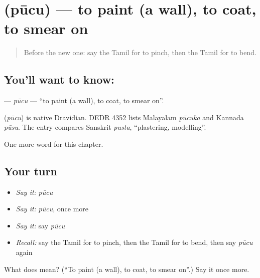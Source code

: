 \section[\texorpdfstring{\ta{பூசு} (pūcu)}{பூசு (pūcu)}]{ (pūcu) — to paint (a wall), to coat, to smear on}

\label{lesson:TA-C200-pucu}



\begin{quote}
Before the new one: say the Tamil for to pinch, then the Tamil for to bend.
\end{quote}

\subsection*{You'll want to know: }
\textbf{} — \emph{pūcu} — \textquotedblleft{}to paint (a wall), to coat, to smear on\textquotedblright{}.

\begin{cousinweb}
\textbf{} (\emph{pūcu}) is native Dravidian. DEDR 4352 lists Malayalam \emph{pūcuka} and Kannada \emph{pūsu}. The entry compares Sanskrit \emph{pusta}, \textquotedblleft{}plastering, modelling\textquotedblright{}.
\end{cousinweb}

\begin{grammarlens}[title={What you've built}]
One more word for this chapter.
\end{grammarlens}

\subsection*{Your turn}
\begin{itemize}
\raggedright
  \item \emph{Say it:} \emph{pūcu}
  \item \emph{Say it:} \emph{pūcu}, once more
  \item \emph{Say it:} say \emph{pūcu}
  \item \emph{Recall:} say the Tamil for to pinch, then the Tamil for to bend, then say \emph{pūcu} again
\end{itemize}

\begin{tcolorbox}[breakable,colback=teal!4,colframe=teal!35!black,title={Before you move on}]
What does  mean? (\textquotedblleft{}To paint (a wall), to coat, to smear on\textquotedblright{}.) Say it once more.
\end{tcolorbox}

